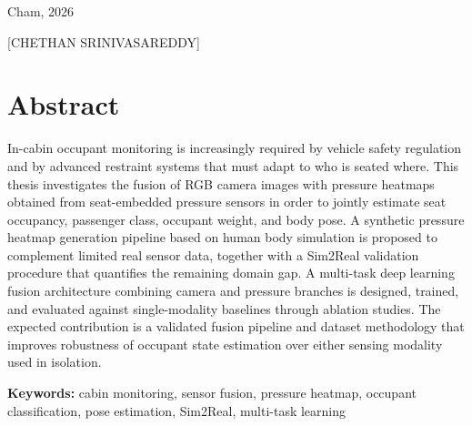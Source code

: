 \documentclass[11pt,a4paper]{report}
\begin{document}
\vspace{2cm}

\noindent Cham, 2026 \hfill \makebox[6cm]{\hrulefill}

\noindent \hfill [CHETHAN SRINIVASAREDDY]
\newpage

\chapter*{Abstract}
In-cabin occupant monitoring is increasingly required by vehicle safety
regulation and by advanced restraint systems that must adapt to who is
seated where. This thesis investigates the fusion of RGB camera images
with pressure heatmaps obtained from seat-embedded pressure sensors in
order to jointly estimate seat occupancy, passenger class, occupant
weight, and body pose. A synthetic pressure heatmap generation pipeline
based on human body simulation is proposed to complement limited real
sensor data, together with a Sim2Real validation procedure that quantifies
the remaining domain gap. A multi-task deep learning fusion architecture
combining camera and pressure branches is designed, trained, and evaluated
against single-modality baselines through ablation studies. The expected
contribution is a validated fusion pipeline and dataset methodology that
improves robustness of occupant state estimation over either sensing
modality used in isolation.

\vspace{0.5cm}
\noindent \textbf{Keywords:} cabin monitoring, sensor fusion, pressure heatmap, occupant classification, pose estimation, Sim2Real, multi-task learning
\newpage

\tableofcontents
\newpage
\listoffigures
\newpage
\listoftables
\newpage



\cleardoublepage
{}
\setcounter{page}{1}











\printbibliography[title=Bibliography]

\appendix

\end{document}

